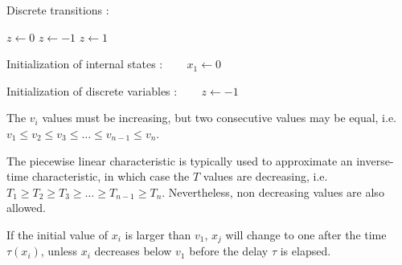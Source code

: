 \pagebreak
Discrete transitions : 

\hspace*{20ex}\begin{minipage}[t]{6cm}
\begin{algorithmic} 
    \STATE $z \gets 0$
  \ENDIF
\ELSE
     \STATE $z \gets -1$
  \ENDIF
\ENDIF
{}
    \STATE $z \gets 1$
  \ENDIF
\ENDIF
\end{algorithmic}
\end{minipage}


\vspace*{2ex}
Initialization of internal states : ~~~ $x_1 \gets 0$

\vspace*{2ex}
Initialization of discrete variables : ~~~ $z \gets -1$


The $v_i$ values must be increasing, but two consecutive values may be equal, i.e. $v_1 \le v_2 \le v_3 \le \ldots \le v_{n-1} \le v_n$.

The piecewise linear characteristic is typically used to approximate an inverse-time characteristic, in which case the $T$ values are decreasing, i.e. $T_1 \ge T_2 \ge T_3 \ge \ldots \ge T_{n-1} \ge T_n$. Nevertheless, non decreasing values are also allowed.

If the initial value of $x_i$ is larger than $v_1$, $x_j$ will change to one after the time $\tau(x_i)$, unless $x_i$ decreases below $v_1$ before the delay $\tau$ is elapsed.